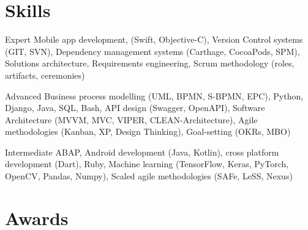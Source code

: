 \documentclass[]{friggeri-cv} %
\begin{document}

\section{Skills}

\begin{entrylist}
	
	
	\smallentry
	{Expert}
	{Mobile app development, (Swift, Objective-C), Version Control systems (GIT, SVN), Dependency management systems (Carthage, CocoaPods, SPM), Solutions architecture, Requirements engineering, Scrum methodology (roles, artifacts, ceremonies)}
	
	
	\smallentry
	{Advanced}
	{Business process modelling (UML, BPMN, S-BPMN, EPC), Python, Django, Java, SQL, Bash, API design (Swagger, OpenAPI), Software Architecture (MVVM, MVC, VIPER, CLEAN-Architecture), Agile methodologies (Kanban, XP, Design Thinking), Goal-setting (OKRs, MBO)}
	
	
	\smallentry
	{Intermediate}
	{ABAP, Android development (Java, Kotlin), cross platform development (Dart), Ruby, Machine learning (TensorFlow, Keras, PyTorch, OpenCV, Pandas, Numpy), Scaled agile methodologies (SAFe, LeSS, Nexus)}
	
	
\end{entrylist}

\pagebreak


\section{Awards}
\end{document}
